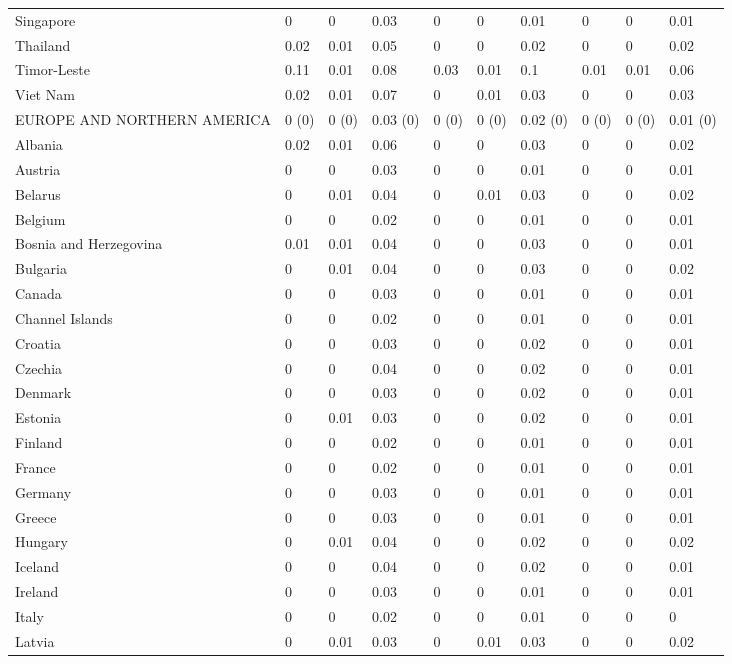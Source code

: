 \begin{longtable}[t]{llllllllll}
Singapore & 0 & 0 & 0.03 & 0 & 0 & 0.01 & 0 & 0 & 0.01\\
Thailand & 0.02 & 0.01 & 0.05 & 0 & 0 & 0.02 & 0 & 0 & 0.02\\
Timor-Leste & 0.11 & 0.01 & 0.08 & 0.03 & 0.01 & 0.1 & 0.01 & 0.01 & 0.06\\
Viet Nam & 0.02 & 0.01 & 0.07 & 0 & 0.01 & 0.03 & 0 & 0 & 0.03\\
EUROPE AND NORTHERN AMERICA & 0 (0) & 0 (0) & 0.03 (0) & 0 (0) & 0 (0) & 0.02 (0) & 0 (0) & 0 (0) & 0.01 (0)\\
Albania & 0.02 & 0.01 & 0.06 & 0 & 0 & 0.03 & 0 & 0 & 0.02\\
Austria & 0 & 0 & 0.03 & 0 & 0 & 0.01 & 0 & 0 & 0.01\\
Belarus & 0 & 0.01 & 0.04 & 0 & 0.01 & 0.03 & 0 & 0 & 0.02\\
Belgium & 0 & 0 & 0.02 & 0 & 0 & 0.01 & 0 & 0 & 0.01\\
Bosnia and Herzegovina & 0.01 & 0.01 & 0.04 & 0 & 0 & 0.03 & 0 & 0 & 0.01\\
Bulgaria & 0 & 0.01 & 0.04 & 0 & 0 & 0.03 & 0 & 0 & 0.02\\
Canada & 0 & 0 & 0.03 & 0 & 0 & 0.01 & 0 & 0 & 0.01\\
Channel Islands & 0 & 0 & 0.02 & 0 & 0 & 0.01 & 0 & 0 & 0.01\\
Croatia & 0 & 0 & 0.03 & 0 & 0 & 0.02 & 0 & 0 & 0.01\\
Czechia & 0 & 0 & 0.04 & 0 & 0 & 0.02 & 0 & 0 & 0.01\\
Denmark & 0 & 0 & 0.03 & 0 & 0 & 0.02 & 0 & 0 & 0.01\\
Estonia & 0 & 0.01 & 0.03 & 0 & 0 & 0.02 & 0 & 0 & 0.01\\
Finland & 0 & 0 & 0.02 & 0 & 0 & 0.01 & 0 & 0 & 0.01\\
France & 0 & 0 & 0.02 & 0 & 0 & 0.01 & 0 & 0 & 0.01\\
Germany & 0 & 0 & 0.03 & 0 & 0 & 0.01 & 0 & 0 & 0.01\\
Greece & 0 & 0 & 0.03 & 0 & 0 & 0.01 & 0 & 0 & 0.01\\
Hungary & 0 & 0.01 & 0.04 & 0 & 0 & 0.02 & 0 & 0 & 0.02\\
Iceland & 0 & 0 & 0.04 & 0 & 0 & 0.02 & 0 & 0 & 0.01\\
Ireland & 0 & 0 & 0.03 & 0 & 0 & 0.01 & 0 & 0 & 0.01\\
Italy & 0 & 0 & 0.02 & 0 & 0 & 0.01 & 0 & 0 & 0\\
Latvia & 0 & 0.01 & 0.03 & 0 & 0.01 & 0.03 & 0 & 0 & 0.02\\

\end{longtable}
